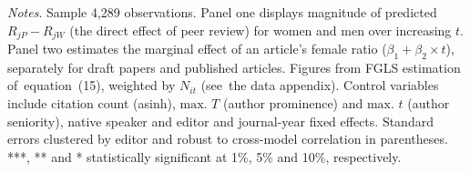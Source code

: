 \begin{table}[H]
\begin{threeparttable}
\begin{tablenotes}
            \item \textit{Notes}. Sample 4,289 observations. Panel one displays magnitude of predicted \(R_{jP}-R_{jW}\) (the direct effect of peer review) for women and men over increasing \(t\). Panel two estimates the marginal effect of an article's female ratio (\(\beta_1+\beta_2\times t\)), separately for draft papers and published articles. Figures from FGLS estimation of~equation~(15), weighted by \(N_{it}\) (see~the data appendix). Control variables include citation count (asinh), \(\text{max. }T\) (author prominence) and \(\text{max. }t\) (author seniority), native speaker and editor and journal-year fixed effects. Standard errors clustered by editor and robust to cross-model correlation in parentheses. ***, ** and * statistically significant at 1\%, 5\% and 10\%, respectively.
        \end{tablenotes}
    \end{threeparttable}
\end{table}